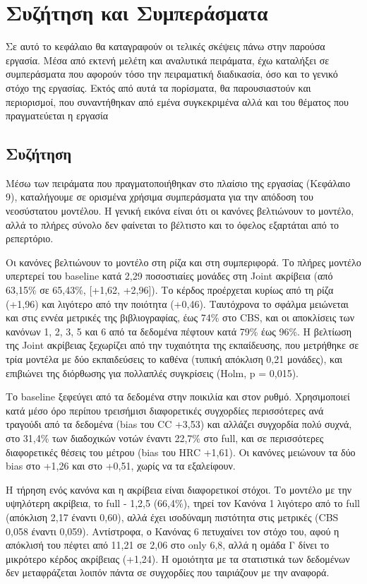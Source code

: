 \chapter{Συζήτηση και Συμπεράσματα}
\label{chapter:conc}

Σε αυτό το κεφάλαιο θα καταγραφούν οι τελικές σκέψεις πάνω στην παρούσα εργασία. Μέσα από εκτενή μελέτη και αναλυτικά πειράματα, έχω καταλήξει σε συμπεράσματα που αφορούν τόσο την πειραματική διαδικασία, όσο και το γενικό στόχο της εργασίας. Εκτός από αυτά τα πορίσματα, θα παρουσιαστούν και περιορισμοί, που συναντήθηκαν από εμένα συγκεκριμένα αλλά και του θέματος που πραγματεύεται η εργασία

\section{Συζήτηση}
Μέσω των πειράματα που πραγματοποιήθηκαν στο πλαίσιο της εργασίας (Κεφάλαιο 9), καταλήγουμε σε ορισμένα χρήσιμα συμπεράσματα για την απόδοση του νεοσύστατου μοντέλου. Η γενική εικόνα είναι ότι οι κανόνες βελτιώνουν το μοντέλο, αλλά το πλήρες σύνολο δεν φαίνεται το βέλτιστο και το όφελος εξαρτάται από το ρεπερτόριο. 

Οι κανόνες βελτιώνουν το μοντέλο στη ρίζα και στη συμπεριφορά. Το πλήρες μοντέλο υπερτερεί του baseline κατά 2,29 ποσοστιαίες μονάδες στη Joint ακρίβεια (από 63,15\% σε 65,43\%, [+1,62, +2,96]). Το κέρδος προέρχεται κυρίως από τη ρίζα (+1,96) και λιγότερο από την ποιότητα (+0,46). Ταυτόχρονα το σφάλμα μειώνεται και στις εννέα μετρικές της βιβλιογραφίας, έως 74\% στο CBS, και οι αποκλίσεις των κανόνων 1, 2, 3, 5 και 6 από τα δεδομένα πέφτουν κατά 79\% έως 96\%. Η βελτίωση της Joint ακρίβειας ξεχωρίζει από την τυχαιότητα της εκπαίδευσης, που μετρήθηκε σε τρία μοντέλα με δύο εκπαιδεύσεις το καθένα (τυπική απόκλιση 0,21 μονάδες), και επιβιώνει της διόρθωσης για πολλαπλές συγκρίσεις (Holm, p = 0,015).

Το baseline ξεφεύγει από τα δεδομένα στην ποικιλία και στον ρυθμό. Χρησιμοποιεί κατά μέσο όρο περίπου τρεισήμισι διαφορετικές συγχορδίες περισσότερες ανά τραγούδι από τα δεδομένα (bias του CC +3,53) και αλλάζει συγχορδία πολύ συχνά, στο 31,4\% των διαδοχικών νοτών έναντι 22,7\% στο full, και σε περισσότερες διαφορετικές θέσεις του μέτρου (bias του HRC +1,61). Οι κανόνες μειώνουν τα δύο bias στο +1,26 και στο +0,51, χωρίς να τα εξαλείφουν.

Η τήρηση ενός κανόνα και η ακρίβεια είναι διαφορετικοί στόχοι. Το μοντέλο με την υψηλότερη ακρίβεια, το full - {1,2,5} (66,4\%), τηρεί τον Κανόνα 1 λιγότερο από το full (απόκλιση 2,17 έναντι 0,60), αλλά έχει ισοδύναμη πιστότητα στις μετρικές (CBS 0,058 έναντι 0,059). Αντίστροφα, ο Κανόνας 6 πετυχαίνει τον στόχο του, αφού η απόκλισή του πέφτει από 11,21 σε 2,06 στο only {6,8}, αλλά η ομάδα Γ δίνει το μικρότερο κέρδος ακρίβειας (+1,24). Η ομοιότητα με τα στατιστικά των δεδομένων δεν μεταφράζεται λοιπόν πάντα σε συγχορδίες που ταιριάζουν με την αναφορά.


